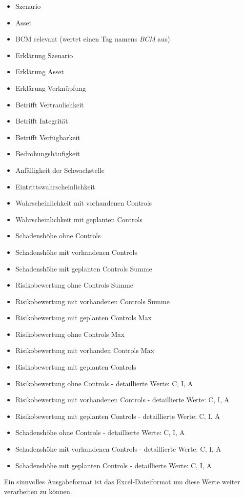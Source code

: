 \documentclass[a4paper,10pt]{book}
\begin{document}
\begin{itemize}
\item Szenario
\item Asset
\item BCM relevant (wertet einen Tag namens \textit{BCM} aus)
\item Erklärung Szenario
\item Erklärung Asset
\item Erklärung Verknüpfung
\item Betrifft Vertraulichkeit
\item Betrifft Integrität
\item Betrifft Verfügbarkeit
\item Bedrohungshäufigkeit
\item Anfälligkeit der Schwachstelle
\item Eintrittswahrscheinlichkeit
\item Wahrscheinlichkeit mit vorhandenen Controls
\item Wahrscheinlichkeit mit geplanten Controls
\item Schadenshöhe ohne Controls
\item Schadenshöhe mit vorhandenen Controls
\item Schadenshöhe mit geplanten Controls Summe
\item Risikobewertung ohne Controls Summe
\item Risikobewertung mit vorhandenen Controls Summe
\item Risikobewertung mit geplanten Controls Max
\item Risikobewertung ohne Controls Max
\item Risikobewertung mit vorhanden Controls Max
\item Risikobewertung mit geplanten Controls
\item Risikobewertung ohne Controls - detaillierte Werte: C, I, A
\item Risikobewertung mit vorhandenen Controls - detaillierte Werte: C, I, A
\item Risikobewertung mit geplanten Controls - detaillierte Werte: C,
  I, A
\item Schadenshöhe ohne Controls - detaillierte Werte: C, I, A
\item Schadenshöhe mit vorhandenen Controls - detaillierte Werte: C,
  I, A
\item Schadenshöhe mit geplanten Controls - detaillierte Werte: C, I,
  A
\end{itemize}

Ein sinnvolles Ausgabeformat ist das Excel-Dateiformat um diese Werte
weiter verarbeiten zu können.
\end{document}
